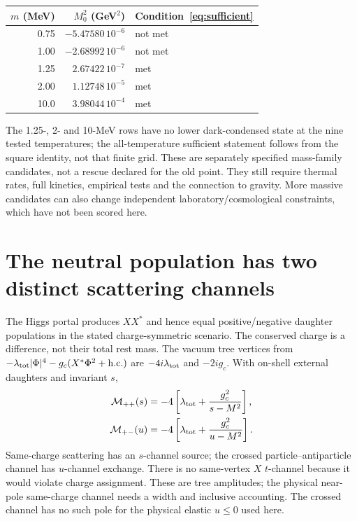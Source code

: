 \documentclass[11pt]{article}
\newcommand{\lt}{\lambda_{\rm tot}}
\begin{document}
\begin{center}
\begin{tabular}{r r l}
\toprule $m$ (MeV) & $M_0^2$ (GeV$^2$) & Condition~\eqref{eq:sufficient}\\\midrule
0.75 & $-5.47580\,10^{-6}$ & not met\\
1.00 & $-2.68992\,10^{-6}$ & not met\\
1.25 & $2.67422\,10^{-7}$ & met\\
2.00 & $1.12748\,10^{-5}$ & met\\
10.0 & $3.98044\,10^{-4}$ & met\\\bottomrule
\end{tabular}
\end{center}
The 1.25-, 2- and 10-MeV rows have no lower dark-condensed state at the
nine tested temperatures; the all-temperature sufficient statement follows
from the square identity, not that finite grid. These are separately
specified mass-family candidates, not a rescue declared for the old point.
They still require thermal rates, full kinetics, empirical tests and the
connection to gravity. More massive candidates can also change independent
laboratory/cosmological constraints, which have not been scored here.

\section{The neutral population has two distinct scattering channels}
The Higgs portal produces $XX^*$ and hence equal positive/negative daughter
populations in the stated charge-symmetric scenario. The conserved charge
is a difference, not their total rest mass. The vacuum tree vertices from
$-\lt|\Phi|^4-g_c(X^*\Phi^2+\mathrm{h.c.})$ are $-4i\lt$ and $-2ig_c$.
With on-shell external daughters and invariant $s$,
\begin{align}
 \mathcal M_{++}(s)&=-4\left[\lt+\frac{g_c^2}{s-M^2}\right],\\
 \mathcal M_{+-}(u)&=-4\left[\lt+\frac{g_c^2}{u-M^2}\right].
\end{align}
Same-charge scattering has an $s$-channel source; the crossed
particle--antiparticle channel has $u$-channel exchange. There is no
same-vertex $X$ $t$-channel because it would violate charge assignment.
These are tree amplitudes; the physical near-pole same-charge channel needs
a width and inclusive accounting. The crossed channel has no such pole for
the physical elastic $u\le0$ used here.
\end{document}
